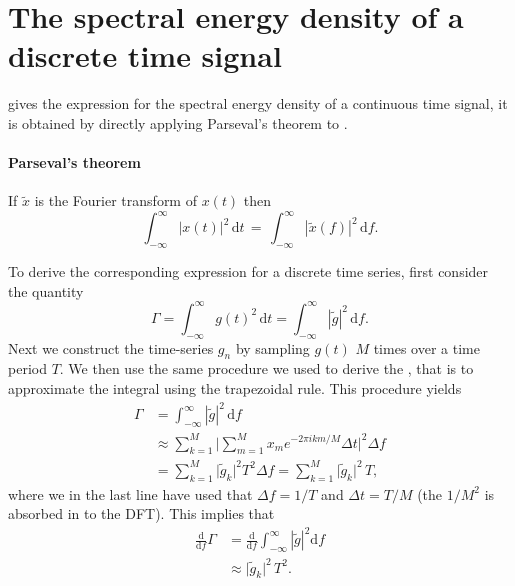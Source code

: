 \section{The spectral energy density of a discrete time signal}
 gives the expression for the spectral energy density of a continuous time signal,
it is obtained by directly applying Parseval's theorem to .
\begin{mdframed}[nobreak=true]
\paragraph{Parseval's theorem}
If $\widetilde{x}$ is the Fourier transform of $x(t)$ then
\begin{equation}
\int_{-\infty}^{\infty} |x(t)|^2 \, \mathrm{d} t \, = \, \int_{-\infty}^{\infty} |\widetilde{x}(f)|^2 \, \mathrm{d} f. 
\end{equation}  
\end{mdframed}
To derive the corresponding expression for a discrete time series, first consider the quantity
\begin{equation}
\Gamma = \int_{-\infty}^{\infty} g(t)^2 \, \mathrm{d} t = \int_{-\infty}^{\infty} |\widetilde{g}|^2 \, \mathrm{d} f.  
\end{equation}
Next we construct the time-series $g_n$ by sampling $g(t)$ $M$ times over a time period $T$.
We then use the same procedure we used to derive the , that is
to approximate the integral using the trapezoidal rule. This procedure yields
\begin{align} 
\Gamma &= \int_{-\infty}^{\infty} |\widetilde{g}|^2 \, \mathrm{d} f \nonumber \\ 
& \approx \sum_{k=1}^{M} \Big| \sum_{m=1}^{M} x_m e^{-2 \pi i k m/M} \Delta t \Big|^2 \Delta f \nonumber \\
& = \sum_{k=1}^{M} \big|\widetilde{g}_k \big|^2 T^2 \Delta f =  \sum_{k=1}^{M} \big|\widetilde{g}_k \big|^2 \, T,
\end{align}
where we in the last line have used that $\Delta f = 1/T$ and $\Delta t = T/M$ 
(the $1/M^2$ is absorbed in to the DFT). 
This implies that 
\begin{align}
\frac{\mathrm{d}}{\mathrm{d} f} \Gamma &= \frac{\mathrm{d}}{\mathrm{d} f} \int_{-\infty}^{\infty} |\widetilde{g}|^2 \mathrm{d} f \nonumber \\
&\approx \big|\widetilde{g}_k \big|^2 \, T^2.
\end{align}
